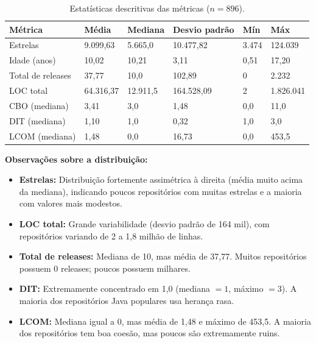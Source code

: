 \documentclass[12pt,a4paper]{article}
\begin{document}
\begin{table}[H]
\centering
\caption{Estatísticas descritivas das métricas ($n = 896$).}
\label{tab:descritivas}
\small
\begin{tabular}{lR{1.8cm}R{1.5cm}R{2cm}R{1.5cm}R{2cm}}
\toprule
\textbf{Métrica} & \textbf{Média} & \textbf{Mediana} & \textbf{Desvio padrão} & \textbf{Mín} & \textbf{Máx} \\
\midrule
Estrelas            & 9.099,63   & 5.665,0    & 10.477,82   & 3.474     & 124.039   \\
Idade (anos)        & 10,02      & 10,21      & 3,11        & 0,51      & 17,20     \\
Total de releases   & 37,77      & 10,0       & 102,89      & 0         & 2.232     \\
LOC total           & 64.316,37  & 12.911,5   & 164.528,09  & 2         & 1.826.041 \\
\midrule
CBO (mediana)       & 3,41       & 3,0        & 1,48        & 0,0       & 11,0      \\
DIT (mediana)       & 1,10       & 1,0        & 0,32        & 1,0       & 3,0       \\
LCOM (mediana)      & 1,48       & 0,0        & 16,73       & 0,0       & 453,5     \\
\bottomrule
\end{tabular}
\end{table}

\textbf{Observações sobre a distribuição:}

\begin{itemize}
    \item \textbf{Estrelas:} Distribuição fortemente assimétrica à direita (média muito acima da mediana), indicando poucos repositórios com muitas estrelas e a maioria com valores mais modestos.
    \item \textbf{LOC total:} Grande variabilidade (desvio padrão de 164 mil), com repositórios variando de 2 a 1,8 milhão de linhas.
    \item \textbf{Total de releases:} Mediana de 10, mas média de 37,77. Muitos repositórios possuem 0 releases; poucos possuem milhares.
    \item \textbf{DIT:} Extremamente concentrado em 1,0 (mediana $= 1$, máximo $= 3$). A maioria dos repositórios Java populares usa herança rasa.
    \item \textbf{LCOM:} Mediana igual a 0, mas média de 1,48 e máximo de 453,5. A maioria dos repositórios tem boa coesão, mas poucos são extremamente ruins.
\end{itemize}
\end{document}
